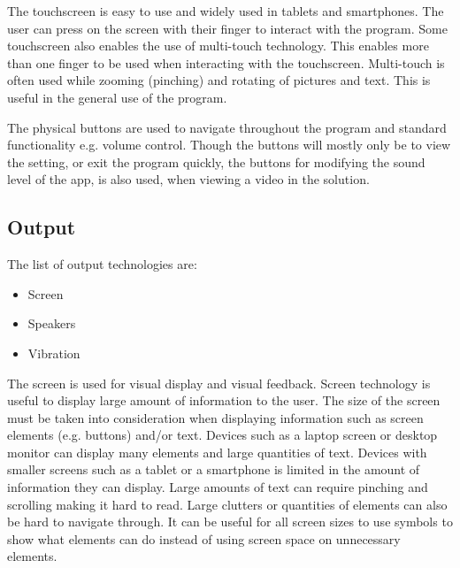 The touchscreen is easy to use and widely used\cite{barcodeInc_FAQ} in tablets and smartphones. The user can press on the screen with their finger to interact with the program. Some touchscreen also enables the use of multi-touch technology. This enables more than one finger to be used when interacting with the touchscreen. Multi-touch is often used while zooming (pinching) and rotating of pictures and text. T\textsl{}his is useful in the general use of the program.
%

The physical buttons are used to navigate throughout the program and standard functionality e.g. volume control. Though the buttons will mostly only be to view the setting, or exit the program quickly, the buttons for modifying the sound level of the app, is also used, when viewing a video in the solution.

\subsection{Output}
The list of output technologies are:

\begin{itemize}
    \item Screen
    \item Speakers
    \item Vibration
\end{itemize}

The screen is used for visual display and visual feedback. Screen technology is useful to display large amount of information to the user.
The size of the screen must be taken into consideration when displaying information such as screen elements (e.g. buttons) and/or text.
Devices such as a laptop screen or desktop monitor can display many elements and large quantities of text.
Devices with smaller screens such as a tablet or a smartphone is limited in the amount of information they can display.
Large amounts of text can require pinching and scrolling making it hard to read. Large clutters or quantities of elements can also be hard to navigate through.
It can be useful for all screen sizes to use symbols to show what elements can do instead of using screen space on unnecessary elements.

